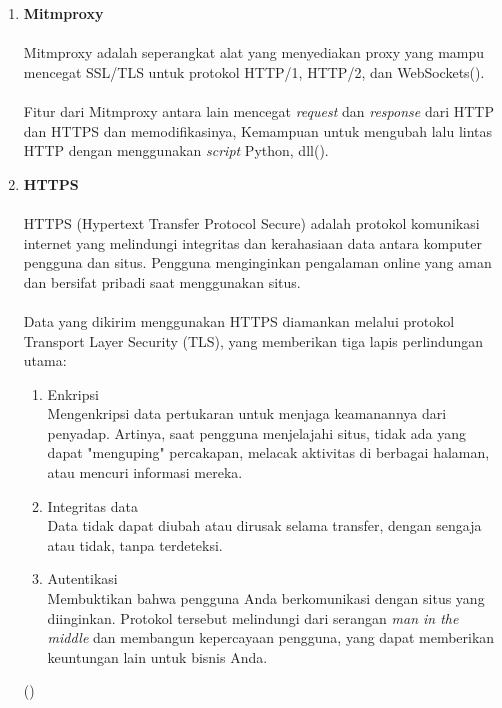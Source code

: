 \documentclass[./bab_2.tex]{subfiles}
\begin{document}
\begin{enumerate}[label=\textbf{\arabic*.}]
  \item \textbf{Mitmproxy}
  \paragraph*{}Mitmproxy adalah seperangkat alat yang
  menyediakan proxy yang mampu mencegat SSL/TLS untuk
  protokol HTTP/1, HTTP/2, dan WebSockets(\cite{mitm}).

  \paragraph*{}Fitur dari Mitmproxy antara lain mencegat
  \textit{request} dan \textit{response} dari  HTTP dan
  HTTPS dan memodifikasinya, Kemampuan untuk mengubah lalu
  lintas HTTP dengan menggunakan \textit{script} Python,
  dll(\cite{mitm}).

  \item \textbf{HTTPS}
  \paragraph*{}HTTPS (Hypertext Transfer Protocol Secure)
  adalah protokol komunikasi internet yang melindungi
  integritas dan kerahasiaan data antara komputer pengguna
  dan situs. Pengguna menginginkan pengalaman online yang
  aman dan bersifat pribadi saat menggunakan situs.

  \paragraph*{}Data yang dikirim menggunakan HTTPS diamankan
  melalui protokol Transport Layer Security (TLS), yang
  memberikan tiga lapis perlindungan utama:
  \begin{enumerate}
    \item Enkripsi\\
      Mengenkripsi data pertukaran untuk menjaga keamanannya
      dari penyadap. Artinya, saat pengguna menjelajahi
      situs, tidak ada yang dapat "menguping" percakapan,
      melacak aktivitas di berbagai halaman, atau mencuri
      informasi mereka.
    \item Integritas data\\
      Data tidak dapat diubah atau dirusak selama transfer,
      dengan sengaja atau tidak, tanpa terdeteksi.
    \item Autentikasi\\
      Membuktikan bahwa pengguna Anda berkomunikasi dengan
      situs yang diinginkan. Protokol tersebut melindungi
      dari serangan \textit{man in the middle} dan membangun
      kepercayaan pengguna, yang dapat memberikan keuntungan
      lain untuk bisnis Anda.
  \end{enumerate}
  (\cite{googledev-https})


\end{enumerate}
\end{document}
